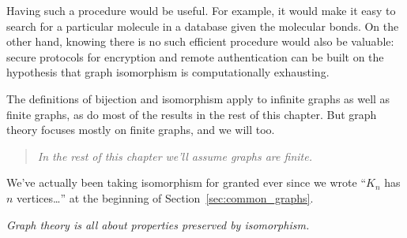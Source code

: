 Having such a procedure would be useful.  For example, it would make it
easy to search for a particular molecule in a database given the molecular
bonds.  On the other hand, knowing there is no such efficient procedure
would also be valuable: secure protocols for encryption and remote
authentication can be built on the hypothesis that graph isomorphism is
computationally exhausting.

\iffalse
An isomorphism between the two graphs shown in
Figure~\ref{fig:isomorphism} is easy to read off:
\[
\begin{array}{lll}
a \text{ corresponds to } 1 & \hspace{0.5in} & b \text{ corresponds to } 2 \\
d \text{ corresponds to } 4 & & c \text{ corresponds to } 3.
\end{array}
\]

To see why this works, look at any edge in the first graph, say
$\edge{b}{c}$, and make sure that the vertices corresponding to $b$ and
$c$ are the endpoints of an edge in the second graph.  Namely, verify that
$\edge{2}{3}$ is an edge of the second graph; and it is.  Conversely, look
at any edge in the second graph, say $\edge{3}{4}$, and verify that the
corresponding vertices are the endpoints of an edge of the first
graph. Namely, verify that $\edge{c}{d}$ is an edge of the first graph;
and it is.  It's a good practice exercise to verify that every edge in
either of these graphs exactly corresponds in this way to an edge in the
other graph.
\fi

The definitions of bijection and isomorphism apply to infinite graphs
as well as finite graphs, as do most of the results in the rest of
this chapter.  But graph theory focuses mostly on finite graphs, and
we will too.
\begin{quote}
 \emph{In the rest of this chapter we'll assume graphs
  are finite.}
\end{quote}

We've actually been taking isomorphism for granted ever since we wrote
``$K_n$ has $n$ vertices\dots'' at the beginning of
Section~\ref{sec:common_graphs}.  

\iffalse
A pickier sentence is ``Any graph isomorphic to some graph
that is a $K_n$ has $n$ vertices\dots.''  But since having $n$
vertices is a property preserved by isomorphism, the picky version is
unnecessary if not silly.
\fi

\emph{Graph theory is all about properties preserved by isomorphism.}

